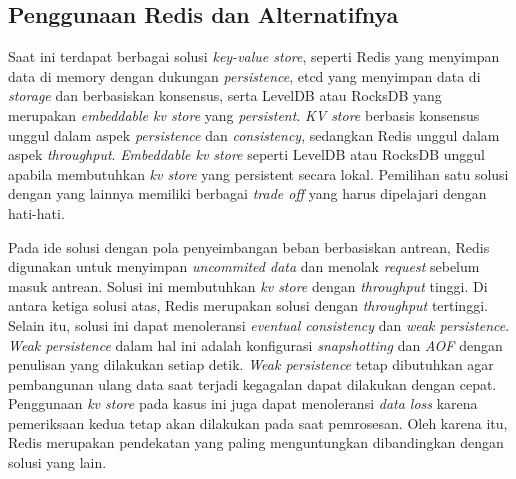 \subsection{Penggunaan Redis dan Alternatifnya}

Saat ini terdapat berbagai solusi \textit{key-value store}, seperti Redis yang menyimpan data di memory dengan dukungan \textit{persistence}, etcd yang menyimpan data di \textit{storage} dan berbasiskan konsensus, serta LevelDB atau RocksDB yang merupakan \textit{embeddable kv store} yang \textit{persistent}. \textit{KV store} berbasis konsensus unggul dalam aspek \textit{persistence} dan \textit{consistency}, sedangkan Redis unggul dalam aspek \textit{throughput}. \textit{Embeddable kv store} seperti LevelDB atau RocksDB unggul apabila membutuhkan \textit{kv store} yang persistent secara lokal. Pemilihan satu solusi dengan yang lainnya memiliki berbagai \textit{trade off} yang harus dipelajari dengan hati-hati.

Pada ide solusi dengan pola penyeimbangan beban berbasiskan antrean, Redis digunakan untuk menyimpan \textit{uncommited data} dan menolak \textit{request} sebelum masuk antrean. Solusi ini membutuhkan \textit{kv store} dengan \textit{throughput} tinggi. Di antara ketiga solusi atas, Redis merupakan solusi dengan \textit{throughput} tertinggi. Selain itu, solusi ini dapat menoleransi \textit{eventual consistency} dan \textit{weak persistence}. \textit{Weak persistence} dalam hal ini adalah konfigurasi \textit{snapshotting} dan \textit{AOF} dengan penulisan yang dilakukan setiap detik. \textit{Weak persistence} tetap dibutuhkan agar pembangunan ulang data saat terjadi kegagalan dapat dilakukan dengan cepat. Penggunaan \textit{kv store} pada kasus ini juga dapat menoleransi \textit{data loss} karena pemeriksaan kedua tetap akan dilakukan pada saat pemrosesan. Oleh karena itu, Redis merupakan pendekatan yang paling menguntungkan dibandingkan dengan solusi yang lain.

